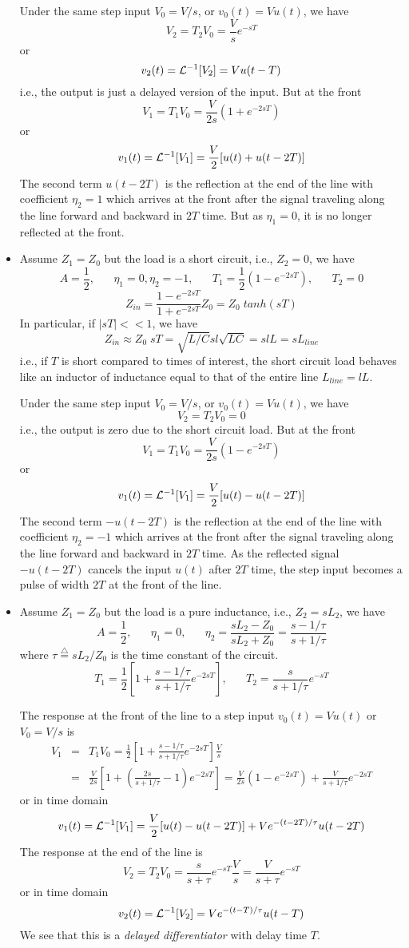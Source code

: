 \begin{itemize}
Under the same step input $V_0=V/s$, or $v_0(t)=Vu(t)$, we have
\[	V_2=T_2V_0=\frac{V}{s}e^{-sT}	\]
or
\[	v_2(t)={\cal L}^{-1}[V_2]=Vu(t-T)	\]
i.e., the output is just a delayed version of the input. But at the
front
\[	V_1=T_1V_0=\frac{V}{2s}(1+e^{-2sT})	\]
or
\[	v_1(t)={\cal L}^{-1}[V_1]=\frac{V}{2}[u(t)+u(t-2T)]	\]
The second term $u(t-2T)$ is the reflection at the end of the line
with coefficient $\eta_2=1$ which arrives at the front after
the signal traveling along the line forward and backward in $2T$ time.
But as $\eta_1=0$, it is no longer reflected at the front.

\item Assume $Z_1=Z_0$ but the load is a short circuit, i.e., 
$Z_2=0$, we have
\[	A=\frac{1}{2},\;\;\;\;\;\;\eta_1=0,\eta_2=-1,\;\;\;\;\;\;
	T_1=\frac{1}{2}(1-e^{-2sT}),\;\;\;\;\;\;T_2=0	\]
\[ Z_{in}=\frac{1-e^{-2sT}}{1+e^{-2sT}}Z_0=Z_0\;tanh(sT) \]
In particular, if $|sT| << 1$, we have
\[ Z_{in}\approx Z_0 \;sT=\sqrt{L/C}sl\sqrt{LC}
	=slL=sL_{line}	\]
i.e., if $T$ is short compared to times of interest, the short
circuit load behaves like an inductor of inductance equal to that of 
the entire line $L_{line}=lL$.

Under the same step input $V_0=V/s$, or $v_0(t)=Vu(t)$, we have
\[	V_2=T_2V_0=0	\]
i.e., the output is zero due to the short circuit load. But at the
front
\[	V_1=T_1V_0=\frac{V}{2s}(1-e^{-2sT})	\]
or
\[	v_1(t)={\cal L}^{-1}[V_1]=\frac{V}{2}[u(t)-u(t-2T)]	\]
The second term $-u(t-2T)$ is the reflection at the end of the line
with coefficient $\eta_2=-1$ which arrives at the front after
the signal traveling along the line forward and backward in $2T$ time.
As the reflected signal $-u(t-2T)$ cancels the input $u(t)$ after $2T$
time, the step input becomes a pulse of width $2T$ at the front of
the line.

\item Assume $Z_1=Z_0$ but the load is a pure inductance, i.e.,
$Z_2=sL_2$, we have
\[	A=\frac{1}{2},\;\;\;\;\;\;\eta_1=0,\;\;\;\;\;\;
\eta_2=\frac{sL_2-Z_0}{sL_2+Z_0}=\frac{s-1/\tau}{s+1/\tau} \]
where $\tau\stackrel{\triangle}{=}sL_2/Z_0$ is the time constant of the
circuit. 
\[	T_1=\frac{1}{2}\left[1+\frac{s-1/\tau}{s+1/\tau} e^{-2sT}\right],
\;\;\;\;\;\;T_2=\frac{s}{s+1/\tau}e^{-sT} \]

The response at the front of the line to a step input 
$v_0(t)=Vu(t)$ or $V_0=V/s$ is
\begin{eqnarray}
V_1 & = & T_1V_0
	=\frac{1}{2}\left[1+\frac{s-1/\tau}{s+1/\tau}e^{-2sT}\right]\frac{V}{s}
	\nonumber \\
 & = & \frac{V}{2s}\left[1+\left(\frac{2s}{s+1/\tau}-1\right)e^{-2sT}\right]
  =\frac{V}{2s}\left(1-e^{-2sT}\right)+\frac{V}{s+1/\tau}e^{-2sT}
	\nonumber 
\end{eqnarray}
or in time domain
\[	v_1(t)={\cal L}^{-1}[V_1]=\frac{V}{2}[u(t)-u(t-2T)]+Ve^{-(t-2T)/\tau}u(t-2T) \]
The response at the end of the line is
\[ 	V_2=T_2V_0=\frac{s}{s+\tau}e^{-sT} \frac{V}{s}
	=\frac{V}{s+\tau}e^{-sT} \]
or in time domain
\[	v_2(t)={\cal L}^{-1}[V_2]=Ve^{-(t-T)/\tau}u(t-T)	\]
We see that this is a {\em delayed differentiator} with delay time $T$. 


\end{itemize}
